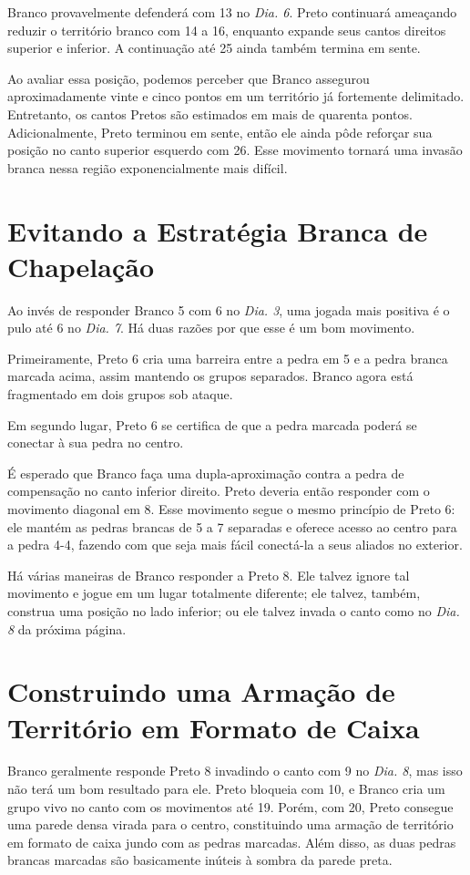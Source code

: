 Branco provavelmente defenderá com 13 no \emph{Dia. 6}. Preto continuará ameaçando reduzir o território branco com 14 a 16, enquanto expande seus cantos direitos superior e inferior. A continuação até 25 ainda também termina em sente.

Ao avaliar essa posição, podemos perceber que Branco assegurou aproximadamente vinte e cinco pontos em um território já fortemente delimitado. Entretanto, os cantos Pretos são estimados em mais de quarenta pontos. Adicionalmente, Preto terminou em sente, então ele ainda pôde reforçar sua posição no canto superior esquerdo com 26. Esse movimento tornará uma invasão branca nessa região exponencialmente mais difícil.

\section{Evitando a Estratégia Branca de Chapelação}

Ao invés de responder Branco 5 com 6 no \emph{Dia. 3}, uma jogada mais positiva é o pulo até 6 no \emph{Dia. 7}. Há duas razões por que esse é um bom movimento.

Primeiramente, Preto 6 cria uma barreira entre a pedra em 5 e a pedra branca marcada acima, assim mantendo os grupos separados. Branco agora está fragmentado em dois grupos sob ataque.

Em segundo lugar, Preto 6 se certifica de que a pedra marcada poderá se conectar à sua pedra no centro.

É esperado que Branco faça uma dupla-aproximação contra a pedra de compensação no canto inferior direito. Preto deveria então responder com o movimento diagonal em 8. Esse movimento segue o mesmo princípio de Preto 6: ele mantém as pedras brancas de 5 a 7 separadas e oferece acesso ao centro para a pedra 4-4, fazendo com que seja mais fácil conectá-la a seus aliados no exterior.

Há várias maneiras de Branco responder a Preto 8. Ele talvez ignore tal movimento e jogue em um lugar totalmente diferente; ele talvez, também, construa uma posição no lado inferior; ou ele talvez invada o canto como no \emph{Dia. 8} da próxima página.

\section{Construindo uma Armação de Território em Formato de Caixa}

Branco geralmente responde Preto 8 invadindo o canto com 9 no \emph{Dia. 8}, mas isso não terá um bom resultado para ele. Preto bloqueia com 10, e Branco cria um grupo vivo no canto com os movimentos até 19. Porém, com 20, Preto consegue uma parede densa virada para o centro, constituindo uma armação de território em formato de caixa jundo com as pedras marcadas. Além disso, as duas pedras brancas marcadas são basicamente inúteis à sombra da parede preta.

